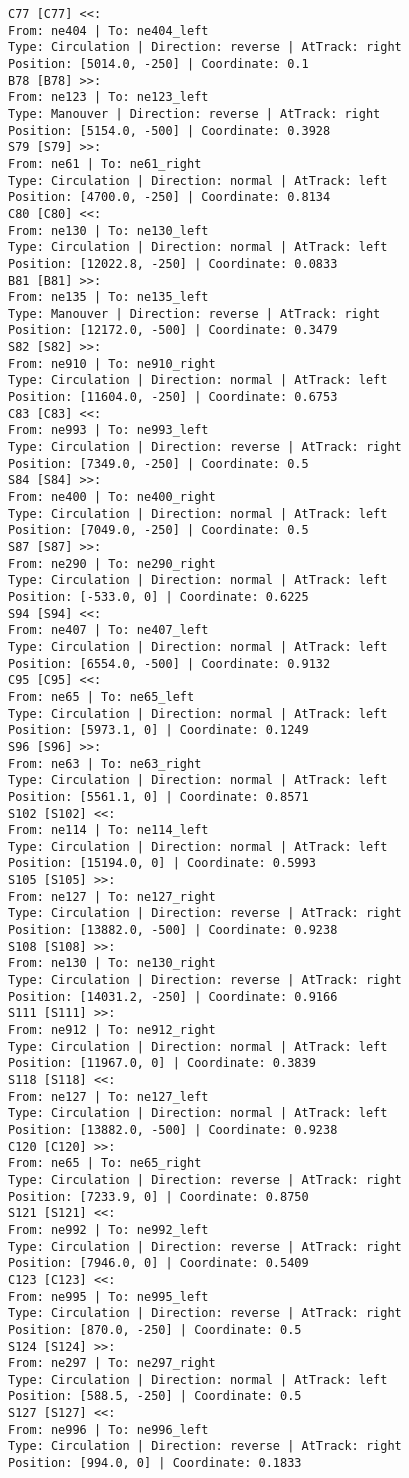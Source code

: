 \begin{lstlisting}[language = {}, tabsize=4, basicstyle=\footnotesize\ttfamily, showspaces=false, showstringspaces=false, caption = Signalling.RNA, label = {lst:EJ4_6}]
C77 [C77] <<:
From: ne404 | To: ne404_left
Type: Circulation | Direction: reverse | AtTrack: right 
Position: [5014.0, -250] | Coordinate: 0.1
B78 [B78] >>:
From: ne123 | To: ne123_left
Type: Manouver | Direction: reverse | AtTrack: right 
Position: [5154.0, -500] | Coordinate: 0.3928
S79 [S79] >>:
From: ne61 | To: ne61_right
Type: Circulation | Direction: normal | AtTrack: left 
Position: [4700.0, -250] | Coordinate: 0.8134
C80 [C80] <<:
From: ne130 | To: ne130_left
Type: Circulation | Direction: normal | AtTrack: left 
Position: [12022.8, -250] | Coordinate: 0.0833
B81 [B81] >>:
From: ne135 | To: ne135_left
Type: Manouver | Direction: reverse | AtTrack: right 
Position: [12172.0, -500] | Coordinate: 0.3479
S82 [S82] >>:
From: ne910 | To: ne910_right
Type: Circulation | Direction: normal | AtTrack: left 
Position: [11604.0, -250] | Coordinate: 0.6753
C83 [C83] <<:
From: ne993 | To: ne993_left
Type: Circulation | Direction: reverse | AtTrack: right 
Position: [7349.0, -250] | Coordinate: 0.5
S84 [S84] >>:
From: ne400 | To: ne400_right
Type: Circulation | Direction: normal | AtTrack: left 
Position: [7049.0, -250] | Coordinate: 0.5
S87 [S87] >>:
From: ne290 | To: ne290_right
Type: Circulation | Direction: normal | AtTrack: left 
Position: [-533.0, 0] | Coordinate: 0.6225
S94 [S94] <<:
From: ne407 | To: ne407_left
Type: Circulation | Direction: normal | AtTrack: left 
Position: [6554.0, -500] | Coordinate: 0.9132
C95 [C95] <<:
From: ne65 | To: ne65_left
Type: Circulation | Direction: normal | AtTrack: left 
Position: [5973.1, 0] | Coordinate: 0.1249
S96 [S96] >>:
From: ne63 | To: ne63_right
Type: Circulation | Direction: normal | AtTrack: left 
Position: [5561.1, 0] | Coordinate: 0.8571
S102 [S102] <<:
From: ne114 | To: ne114_left
Type: Circulation | Direction: normal | AtTrack: left 
Position: [15194.0, 0] | Coordinate: 0.5993
S105 [S105] >>:
From: ne127 | To: ne127_right
Type: Circulation | Direction: reverse | AtTrack: right 
Position: [13882.0, -500] | Coordinate: 0.9238
S108 [S108] >>:
From: ne130 | To: ne130_right
Type: Circulation | Direction: reverse | AtTrack: right 
Position: [14031.2, -250] | Coordinate: 0.9166
S111 [S111] >>:
From: ne912 | To: ne912_right
Type: Circulation | Direction: normal | AtTrack: left 
Position: [11967.0, 0] | Coordinate: 0.3839
S118 [S118] <<:
From: ne127 | To: ne127_left
Type: Circulation | Direction: normal | AtTrack: left 
Position: [13882.0, -500] | Coordinate: 0.9238
C120 [C120] >>:
From: ne65 | To: ne65_right
Type: Circulation | Direction: reverse | AtTrack: right 
Position: [7233.9, 0] | Coordinate: 0.8750
S121 [S121] <<:
From: ne992 | To: ne992_left
Type: Circulation | Direction: reverse | AtTrack: right 
Position: [7946.0, 0] | Coordinate: 0.5409
C123 [C123] <<:
From: ne995 | To: ne995_left
Type: Circulation | Direction: reverse | AtTrack: right 
Position: [870.0, -250] | Coordinate: 0.5
S124 [S124] >>:
From: ne297 | To: ne297_right
Type: Circulation | Direction: normal | AtTrack: left 
Position: [588.5, -250] | Coordinate: 0.5
S127 [S127] <<:
From: ne996 | To: ne996_left
Type: Circulation | Direction: reverse | AtTrack: right 
Position: [994.0, 0] | Coordinate: 0.1833
	\end{lstlisting}	
